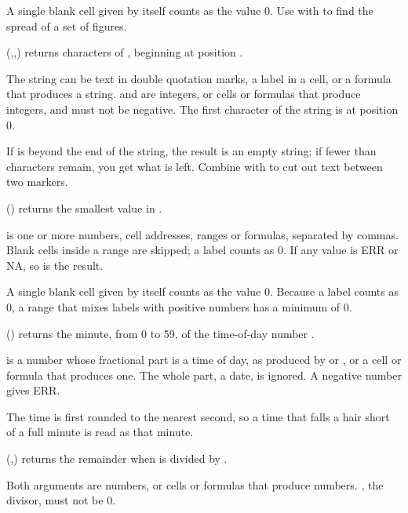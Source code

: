 A single blank cell given by itself counts as the value 0. Use  with  to find the spread of a set of figures.

\Examples
{}

(,,) returns  characters of , beginning at position .

The string can be text in double quotation marks, a label in a cell, or a formula that produces a string.  and  are integers, or cells or formulas that produce integers, and must not be negative. The first character of the string is at position 0.

If  is beyond the end of the string, the result is an empty string; if fewer than  characters remain, you get what is left. Combine  with  to cut out text between two markers.

\Examples
{}

() returns the smallest value in .

 is one or more numbers, cell addresses, ranges or formulas, separated by commas. Blank cells inside a range are skipped; a label counts as 0. If any value is ERR or NA, so is the result.

A single blank cell given by itself counts as the value 0. Because a label counts as 0, a range that mixes labels with positive numbers has a minimum of 0.

\Examples
{}

() returns the minute, from 0 to 59, of the time-of-day number .

 is a number whose fractional part is a time of day, as produced by  or , or a cell or formula that produces one. The whole part, a date, is ignored. A negative number gives ERR.

The time is first rounded to the nearest second, so a time that falls a hair short of a full minute is read as that minute.

\Examples
{}

(,) returns the remainder when  is divided by .

Both arguments are numbers, or cells or formulas that produce numbers. , the divisor, must not be 0.

